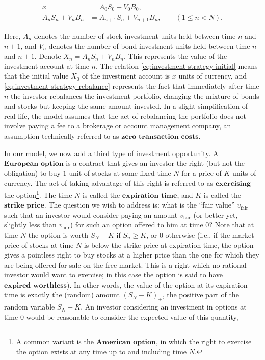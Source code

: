 \documentclass[11pt]{report}
\theoremstyle{plain}
\theoremstyle{definition}
\begin{document}
\begin{align*}
x &= \tag{9}\label{eq:investment-strategy-initial} A_0 S_0 + V_0 B_0, \\
A_n S_n + V_n B_n &= \tag{10}\label{eq:investment-strategy-rebalance} A_{n+1} S_n + V_{n+1} B_n, \qquad (1\le n< N).
\end{align*}

\noindent Here, $A_n$ denotes the number of stock investment
units held between time $n$ and $n+1$, and $V_n$
denotes the number of bond investment units held
between time $n$ and $n+1$. Denote
$X_n = A_n S_n + V_n B_n$. This represents the value
of the investment account at time $n$. The relation
\eqref{eq:investment-strategy-initial} means that the
initial value $X_0$ of the investment account is $x$
units of currency, and
\eqref{eq:investment-strategy-rebalance} represents the
fact that immediately after time $n$ the investor
rebalances the investment portfolio, changing the
mixture of bonds and stocks but keeping the same
amount invested. In a slight simplification of real
life, the model assumes that the act of rebalancing
the portfolio does not involve paying a fee to a
brokerage or account management company, an assumption
technically referred to as
$\textbf{zero transaction costs}$.

In our model, we now add a third type of investment
opportunity. A $\textbf{European option}$ is a
contract that gives an investor the right (but not the
obligation) to buy $1$ unit of stocks at some fixed
time $N$ for a price of $K$ units of currency. The
act of taking advantage of this right is referred to
as $\textbf{exercising}$ the
option\footnote{A common variant is the $\textbf{American option}$,
in which the right to exercise the option exists at
any time up to and including time $N$.}. The time $N$ is called
the $\textbf{expiration time}$, and $K$ is called the
$\textbf{strike price}$. The question we wish to
address is: what is the ``fair value''
$v_\textrm{fair}$ such that an investor would
consider paying an amount $v_\textrm{fair}$ (or
better yet, slightly less than $v_\textrm{fair}$) for
such an option offered to him at time $0$? Note that
at time $N$ the option is worth $S_N-K$ if $S_n\ge K$,
or $0$ otherwise (i.e., if the market price of stocks
at time $N$ is below the strike price at expiration
time, the option gives a pointless right to buy stocks
at a higher price than the one for which they are
being offered for sale on the free market. This is a
right which no rational investor would want to
exercise; in this case the option is said to have
$\textbf{expired worthless}$). In other words, the
value of the option at its expiration time is exactly
the (random) amount $(S_N-K)_+$, the positive part of
the random variable $S_N-K$. An investor considering
an investment in options at time $0$ would be
reasonable to consider the expected value of this
quantity,
\end{document}
